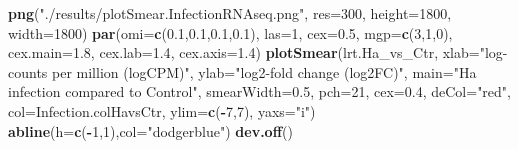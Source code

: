 \documentclass[
]{article}
\newenvironment{Shaded}{\begin{snugshade}}{\end{snugshade}}
\newcommand{\AttributeTok}[1]{\textcolor[rgb]{0.13,0.29,0.53}{#1}}
\newcommand{\DecValTok}[1]{\textcolor[rgb]{0.00,0.00,0.81}{#1}}
\newcommand{\FloatTok}[1]{\textcolor[rgb]{0.00,0.00,0.81}{#1}}
\newcommand{\FunctionTok}[1]{\textcolor[rgb]{0.13,0.29,0.53}{\textbf{#1}}}
\newcommand{\NormalTok}[1]{#1}
\newcommand{\SpecialCharTok}[1]{\textcolor[rgb]{0.81,0.36,0.00}{\textbf{#1}}}
\newcommand{\StringTok}[1]{\textcolor[rgb]{0.31,0.60,0.02}{#1}}
\begin{document}
\begin{Shaded}
\begin{Highlighting}[]
\FunctionTok{png}\NormalTok{(}\StringTok{"./results/plotSmear.InfectionRNAseq.png"}\NormalTok{, }\AttributeTok{res=}\DecValTok{300}\NormalTok{, }\AttributeTok{height=}\DecValTok{1800}\NormalTok{, }\AttributeTok{width=}\DecValTok{1800}\NormalTok{)}
\FunctionTok{par}\NormalTok{(}\AttributeTok{omi=}\FunctionTok{c}\NormalTok{(}\FloatTok{0.1}\NormalTok{,}\FloatTok{0.1}\NormalTok{,}\FloatTok{0.1}\NormalTok{,}\FloatTok{0.1}\NormalTok{), }\AttributeTok{las=}\DecValTok{1}\NormalTok{, }\AttributeTok{cex=}\FloatTok{0.5}\NormalTok{, }\AttributeTok{mgp=}\FunctionTok{c}\NormalTok{(}\DecValTok{3}\NormalTok{,}\DecValTok{1}\NormalTok{,}\DecValTok{0}\NormalTok{), }\AttributeTok{cex.main=}\FloatTok{1.8}\NormalTok{, }\AttributeTok{cex.lab=}\FloatTok{1.4}\NormalTok{, }\AttributeTok{cex.axis=}\FloatTok{1.4}\NormalTok{)}
\FunctionTok{plotSmear}\NormalTok{(lrt.Ha\_vs\_Ctr, }\AttributeTok{xlab=}\StringTok{"log{-}counts per million (logCPM)"}\NormalTok{, }\AttributeTok{ylab=}\StringTok{"log2{-}fold change (log2FC)"}\NormalTok{, }\AttributeTok{main=}\StringTok{"Ha infection compared to Control"}\NormalTok{, }\AttributeTok{smearWidth=}\FloatTok{0.5}\NormalTok{, }\AttributeTok{pch=}\DecValTok{21}\NormalTok{, }\AttributeTok{cex=}\FloatTok{0.4}\NormalTok{, }\AttributeTok{deCol=}\StringTok{"red"}\NormalTok{, }\AttributeTok{col=}\NormalTok{Infection.colHavsCtr, }\AttributeTok{ylim=}\FunctionTok{c}\NormalTok{(}\SpecialCharTok{{-}}\DecValTok{7}\NormalTok{,}\DecValTok{7}\NormalTok{), }\AttributeTok{yaxs=}\StringTok{"i"}\NormalTok{)}
\FunctionTok{abline}\NormalTok{(}\AttributeTok{h=}\FunctionTok{c}\NormalTok{(}\SpecialCharTok{{-}}\DecValTok{1}\NormalTok{,}\DecValTok{1}\NormalTok{),}\AttributeTok{col=}\StringTok{"dodgerblue"}\NormalTok{)}
\FunctionTok{dev.off}\NormalTok{()}
\end{Highlighting}
\end{Shaded}
\end{document}
